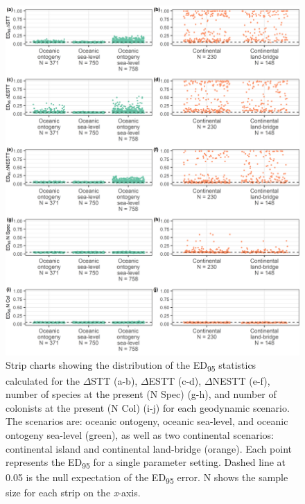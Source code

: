 \documentclass{article}
\begin{document}
\begin{figure}
    \centering
    \includegraphics[width=\textwidth]{scenario.png}
    \caption{Strip charts showing the distribution of the ED\textsubscript{95} statistics calculated for the $\Delta$STT (a-b), $\Delta$ESTT (c-d), $\Delta$NESTT (e-f), number of species at the present (N Spec) (g-h), and number of colonists at the present (N Col) (i-j) for each geodynamic scenario. The scenarios are: oceanic ontogeny, oceanic sea-level, and oceanic ontogeny sea-level (green), as well as two continental scenarios: continental island and continental land-bridge (orange). Each point represents the ED\textsubscript{95} for a single parameter setting. Dashed line at 0.05 is the null expectation of the ED\textsubscript{95} error. N shows the sample size for each strip on the \textit{x}-axis.}
    \label{fig:scenario}
\end{figure}

\clearpage
\end{document}
